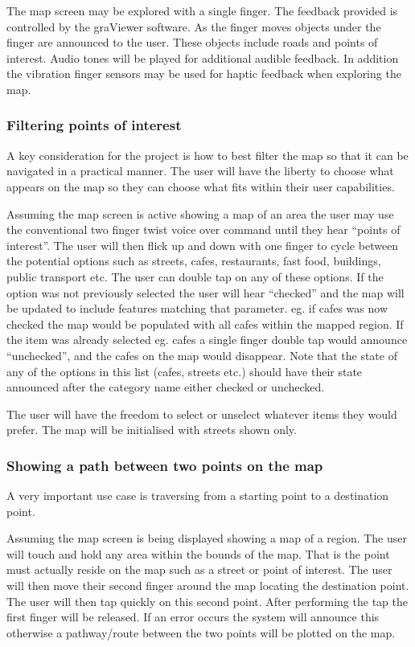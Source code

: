 \documentclass[11pt,twoside,a4paper]{article}
\begin{document}
The map screen may be explored with a single finger. The feedback
provided is controlled by the graViewer software. As the finger moves
objects under the finger are announced to the user. These objects
include roads and points of interest. Audio tones will be played for
additional audible feedback. In addition the vibration finger sensors
may be used for haptic feedback when exploring the map.

\subsubsection{Filtering points of interest}

A key consideration for the project is how to best filter the map so
that it can be navigated in a practical manner. The user will have the
liberty to choose what appears on the map so they can choose what fits
within their user capabilities.

Assuming the map screen is active showing a map of an area the user may
use the conventional two finger twist voice over command until they hear
``points of interest''. The user will then flick up and down with one
finger to cycle between the potential options such as streets, cafes,
restaurants, fast food, buildings, public transport etc. The user can
double tap on any of these options. If the option was not previously
selected the user will hear ``checked'' and the map will be updated to
include features matching that parameter. eg. if cafes was now checked
the map would be populated with all cafes within the mapped region. If
the item was already selected eg. cafes a single finger double tap would
announce ``unchecked'', and the cafes on the map would disappear. Note
that the state of any of the options in this list (cafes, streets etc.)
should have their state announced after the category name either checked
or unchecked. 

The user will have the freedom to select or unselect whatever items they
would prefer. The map will be initialised with streets shown only.

\subsubsection{Showing a path between two points on the map}

A very important use case is traversing from a starting point to a
destination point.

Assuming the map screen is being displayed showing a map of a
region. The user will touch and hold any area within the bounds of the
map. That is the point must actually reside on the map such as a street
or point of interest. The user will then move their second finger around the map locating the destination point. The user will then tap quickly
on this second point. After performing the tap the first finger will be
released. If an error occurs the system will announce this otherwise a
pathway/route between the two points will be plotted on the map.
\end{document}

